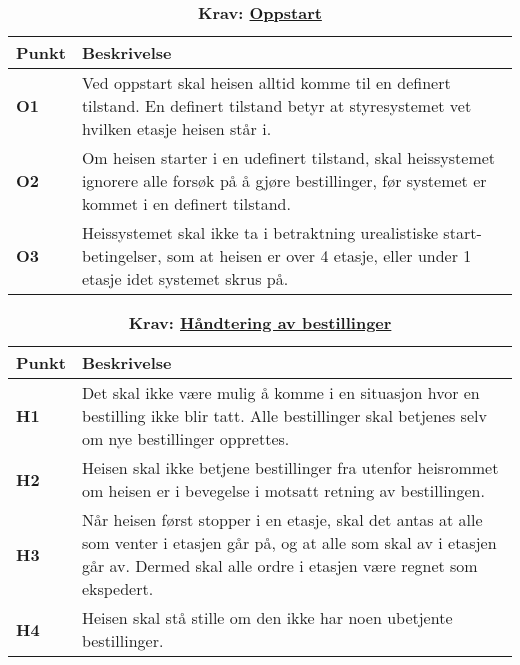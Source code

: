 \begin{table}[H]
    \centering
    \caption*{\textbf{\textcolor{NTNU_blue}{Krav}: \underline{Oppstart}}}
    \begin{tabular}{@{}  |p{1.25cm}| p{12.25cm}|  @{}}
    \hline
    \textbf{Punkt}             & \textbf{Beskrivelse} \\
    \hline
    \textbf{\textcolor{NTNU_blue}{O1}} & Ved oppstart skal heisen alltid komme til en definert tilstand. En definert tilstand betyr at styresystemet vet hvilken etasje heisen står i.\\\cline{1-2} 
    \textbf{\textcolor{NTNU_blue}{O2}} & Om heisen starter i en udefinert tilstand, skal heissystemet ignorere alle forsøk på å gjøre bestillinger, før systemet er kommet i en definert tilstand.\\\cline{1-2} 
    \textbf{\textcolor{NTNU_blue}{O3}} & Heissystemet skal ikke ta i betraktning urealistiske start-betingelser, som at heisen er over 4 etasje, eller under 1 etasje idet systemet skrus på.\\\cline{1-2} 
    \end{tabular}
\end{table}


\begin{table}[H]
    \centering
    \caption*{\textbf{\textcolor{NTNU_blue}{Krav}: \underline{Håndtering av bestillinger}}}
    \begin{tabular}{@{}  |p{1.25cm}| p{12.25cm}|  @{}}
    \hline
    \textbf{Punkt}             & \textbf{Beskrivelse} \\
    \hline
    \textbf{\textcolor{NTNU_blue}{H1}} & Det skal ikke være mulig å komme i en situasjon hvor en bestilling ikke blir tatt. Alle bestillinger skal betjenes selv om nye bestillinger opprettes.\\\cline{1-2} 
    \textbf{\textcolor{NTNU_blue}{H2}} & Heisen skal ikke betjene bestillinger fra utenfor heisrommet om heisen er i bevegelse i motsatt retning av bestillingen.\\\cline{1-2} 
    \textbf{\textcolor{NTNU_blue}{H3}} & Når heisen først stopper i en etasje, skal det antas at alle som venter i etasjen går på, og at alle som skal av i etasjen går av. Dermed skal alle ordre i etasjen være regnet som ekspedert.\\\cline{1-2} 
    \textbf{\textcolor{NTNU_blue}{H4}} & Heisen skal stå stille om den ikke har noen ubetjente bestillinger.\\\cline{1-2}
    \end{tabular}
\end{table}



